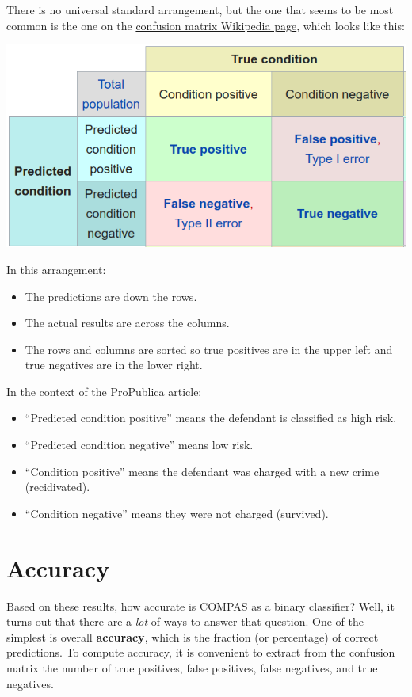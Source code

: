 There is no universal standard arrangement, but the one that seems to be
most common is the one on the
\href{https://en.wikipedia.org/wiki/Confusion_matrix}{confusion matrix
Wikipedia page}, which looks like this:

\includegraphics{figs/confusion_matrix1.png}

In this arrangement:

\begin{itemize}
\item
  The predictions are down the rows.
\item
  The actual results are across the columns.
\item
  The rows and columns are sorted so true positives are in the upper
  left and true negatives are in the lower right.
\end{itemize}

In the context of the ProPublica article:

\begin{itemize}
\item
  ``Predicted condition positive'' means the defendant is classified as
  high risk.
\item
  ``Predicted condition negative'' means low risk.
\item
  ``Condition positive'' means the defendant was charged with a new
  crime (recidivated).
\item
  ``Condition negative'' means they were not charged (survived).
\end{itemize}

\hypertarget{accuracy}{%
\section{Accuracy}\label{accuracy}}

Based on these results, how accurate is COMPAS as a binary classifier?
Well, it turns out that there are a \emph{lot} of ways to answer that
question. One of the simplest is overall \textbf{accuracy}, which is the
fraction (or percentage) of correct predictions. To compute accuracy, it
is convenient to extract from the confusion matrix the number of true
positives, false positives, false negatives, and true negatives.

